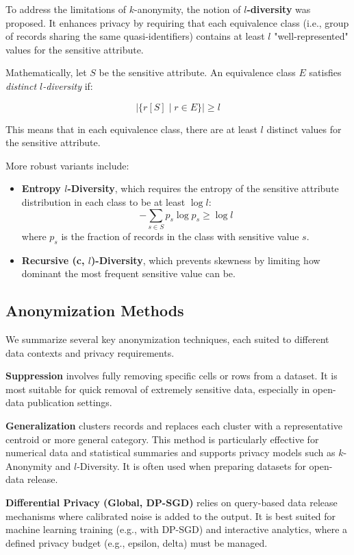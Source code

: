 \documentclass{article}
\begin{document}
To address the limitations of $k$-anonymity, the notion of \textbf{$l$-diversity} was proposed. It enhances privacy by requiring that each equivalence class (i.e., group of records sharing the same quasi-identifiers) contains at least $l$ "well-represented" values for the sensitive attribute.

Mathematically, let $S$ be the sensitive attribute. An equivalence class $E$ satisfies \textit{distinct $l$-diversity} if:

$$
|\{ r[S] \mid r \in E \}| \geq l
$$

This means that in each equivalence class, there are at least $l$ distinct values for the sensitive attribute.

More robust variants include:
\begin{itemize}
\item \textbf{Entropy $l$-Diversity}, which requires the entropy of the sensitive attribute distribution in each class to be at least $\log l$:
$$
-\sum_{s \in S} p_s \log p_s \geq \log l
$$
where $p_s$ is the fraction of records in the class with sensitive value $s$.

\item \textbf{Recursive (c, $l$)-Diversity}, which prevents skewness by limiting how dominant the most frequent sensitive value can be.
\end{itemize}

\subsection{Anonymization Methods}
We summarize several key anonymization techniques, each suited to different data contexts and privacy requirements.

\textbf{Suppression} involves fully removing specific cells or rows from a dataset. It is most suitable for quick removal of extremely sensitive data, especially in open-data publication settings.

\textbf{Generalization} clusters records and replaces each cluster with a representative centroid or more general category. This method is particularly effective for numerical data and statistical summaries and supports privacy models such as $k$-Anonymity and $l$-Diversity. It is often used when preparing datasets for open-data release.

\textbf{Differential Privacy (Global, DP-SGD)} relies on query-based data release mechanisms where calibrated noise is added to the output. It is best suited for machine learning training (e.g., with DP-SGD) and interactive analytics, where a defined privacy budget (e.g., epsilon, delta) must be managed.
\end{document}
